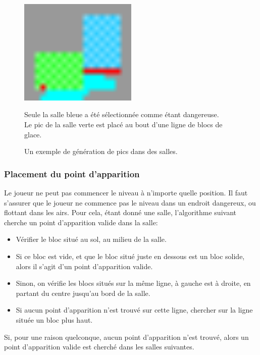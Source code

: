\documentclass[10pt]{report}
\begin{document}
\begin{figure}[H]
  \centering
  \includegraphics[width=0.5\textwidth]{images/ice_spike_trap}
  \caption{Un exemple de génération de pics dans des salles.}
  Seule la salle bleue a été sélectionnée comme étant dangereuse.\\
  Le pic de la salle verte est placé au bout d'une ligne de blocs de glace.
  \label{fig:spike_placement}
\end{figure}

\subsubsection{Placement du point d'apparition}
\label{subsubsec:spawn_point}

Le joueur ne peut pas commencer le niveau à n'importe quelle position.
Il faut s'assurer que le joueur ne commence pas le niveau dans un endroit dangereux, ou flottant dans les airs.
Pour cela, étant donné une salle, l'algorithme suivant cherche un point d'apparition valide dans la salle:

\begin{itemize}
  \item Vérifier le bloc situé au sol, au milieu de la salle.
  \item Si ce bloc est vide, et que le bloc situé juste en dessous est un bloc solide, alors il s'agit d'un
  point d'apparition valide.
  \item Sinon, on vérifie les blocs situés sur la même ligne, à gauche est à droite, en partant du centre jusqu'au
  bord de la salle.
  \item Si aucun point d'apparition n'est trouvé sur cette ligne, chercher sur la ligne située un bloc plus haut.
\end{itemize}

Si, pour une raison quelconque, aucun point d'apparition n'est trouvé, alors un point d'apparition valide est
cherché dans les salles suivantes.
\end{document}
